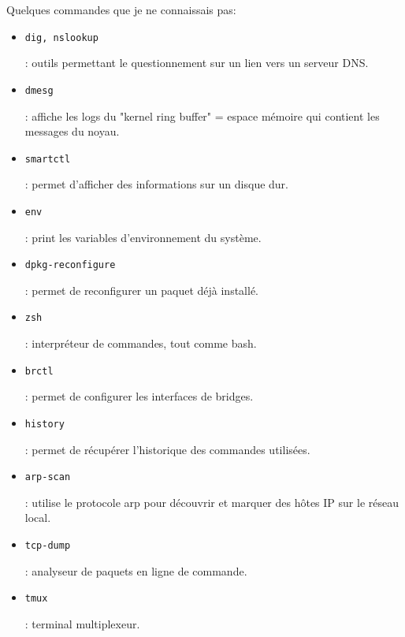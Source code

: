 \documentclass[12pt]{article}
\begin{document}
Quelques commandes que je ne connaissais pas:
\begin{itemize}
    \item \begin{code}\texttt{dig, nslookup}\end{code}: outils permettant le questionnement sur un lien vers un serveur \gls{DNS}. 
    \item \begin{code}\texttt{dmesg}\end{code}: affiche les logs du "kernel ring buffer" = espace mémoire qui contient les messages du noyau.
    \item \begin{code}\texttt{smartctl}\end{code}: permet d'afficher des informations sur un disque dur. 
    \item \begin{code}\texttt{env}\end{code}: print les variables d'environnement du système.
    \item \begin{code}\texttt{dpkg-reconfigure}\end{code}: permet de reconfigurer un paquet déjà installé.
    \item \begin{code}\texttt{zsh}\end{code}: interpréteur de commandes, tout comme bash. 
    \item \begin{code}\texttt{brctl}\end{code}: permet de configurer les interfaces de bridges.
    \item \begin{code}\texttt{history}\end{code}: permet de récupérer l'historique des commandes utilisées.
    \item \begin{code}\texttt{arp-scan}\end{code}: utilise le protocole arp pour découvrir et marquer des hôtes \gls{IP} sur le réseau local.
    \item \begin{code}\texttt{tcp-dump}\end{code}: analyseur de paquets en ligne de commande.
    \item \begin{code}\texttt{tmux}\end{code}: terminal multiplexeur.

\end{itemize}
\end{document}
